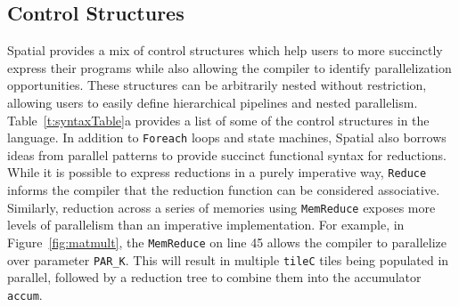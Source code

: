 





\subsection{Control Structures}
\label{controls}

Spatial provides a mix of control structures which help users to more succinctly express their programs while also allowing the compiler to identify parallelization opportunities.
These structures can be arbitrarily nested without restriction, allowing users to easily define hierarchical pipelines and nested parallelism. Table~\ref{t:syntaxTable}a provides a list of some of the control structures in the language. In addition to \texttt{\small{Foreach}} loops and state machines, Spatial also borrows ideas
from parallel patterns \cite{delite-tecs14, pldi13halide} to provide succinct functional syntax for reductions.
While it is possible to express
reductions in a purely imperative way, \texttt{\small{Reduce}} informs the compiler that the
reduction function can be considered associative.
Similarly, reduction across a series of memories using \texttt{\small{MemReduce}} exposes more levels of parallelism than an imperative implementation.
For example, in Figure~\ref{fig:matmult}, the \texttt{\small{MemReduce}} on line 45 allows the compiler to parallelize over parameter \texttt{\small{PAR\_K}}. This will result in multiple \texttt{\small{tileC}} tiles being populated in parallel, followed by a reduction tree to combine them into the accumulator \texttt{\small{accum}}.

